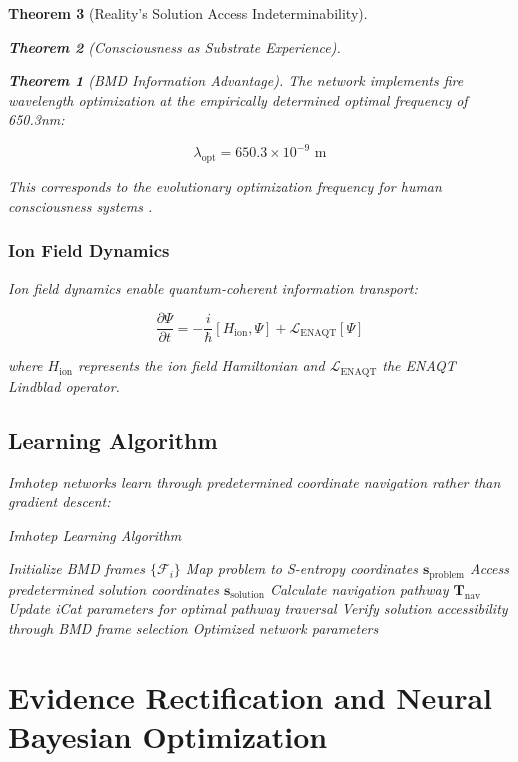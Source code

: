 \documentclass[12pt,a4paper]{article}
\newtheorem{theorem}{Theorem}[section]
\theoremstyle{remark}
\begin{document}
\begin{theorem}[Reality's Solution Access Indeterminability]
\begin{theorem}[Consciousness as Substrate Experience]
\begin{theorem}[BMD Information Advantage]
{{{The network implements fire wavelength optimization at the empirically determined optimal frequency of 650.3nm:

\begin{equation}
\lambda_{\text{opt}} = 650.3 \times 10^{-9} \text{ m}
\end{equation}

This corresponds to the evolutionary optimization frequency for human consciousness systems \cite{sachikonye2024biooscillations}.

\subsubsection{Ion Field Dynamics}

Ion field dynamics enable quantum-coherent information transport:

\begin{equation}
\frac{\partial \Psi}{\partial t} = -\frac{i}{\hbar}[H_{\text{ion}}, \Psi] + \mathcal{L}_{\text{ENAQT}}[\Psi]
\end{equation}

where $H_{\text{ion}}$ represents the ion field Hamiltonian and $\mathcal{L}_{\text{ENAQT}}$ the ENAQT Lindblad operator.

\subsection{Learning Algorithm}

Imhotep networks learn through predetermined coordinate navigation rather than gradient descent:

\begin{algorithm}
\caption{Imhotep Learning Algorithm}
\begin{algorithmic}[1]
\STATE Initialize BMD frames $\{\mathcal{F}_i\}$
\STATE Map problem to S-entropy coordinates $\mathbf{s}_{\text{problem}}$
\STATE Access predetermined solution coordinates $\mathbf{s}_{\text{solution}}$
\STATE Calculate navigation pathway $\mathbf{T}_{\text{nav}}$
\STATE Update iCat parameters for optimal pathway traversal
\STATE Verify solution accessibility through BMD frame selection
\RETURN Optimized network parameters
\end{algorithmic}
\end{algorithm}

\section{Evidence Rectification and Neural Bayesian Optimization}

}}}
\end{theorem}
\end{theorem}
\end{theorem}
\end{document}
